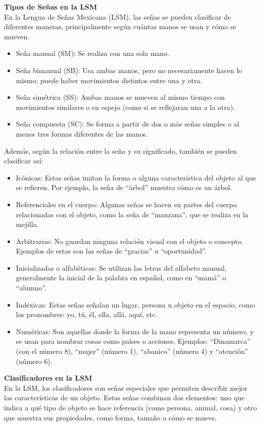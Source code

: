 \textbf{Tipos de Señas en la LSM}\\
En la Lengua de Señas Mexicana (LSM), las señas se pueden clasificar de diferentes maneras, principalmente según cuántas manos se usan y cómo se mueven.

\begin{itemize}
    \item Seña manual (SM): Se realiza con una sola mano.
    \item Seña bimanual (SB): Usa ambas manos, pero no necesariamente hacen lo mismo; puede haber movimientos distintos entre una y otra.
    \item Seña simétrica (SS): Ambas manos se mueven al mismo tiempo con movimientos similares o en espejo (como si se reflejaran una a la otra).
    \item Seña compuesta (SC): Se forma a partir de dos o más señas simples o al menos tres formas diferentes de las manos.
\end{itemize}

\newpage
Además, según la relación entre la seña y su significado, también se pueden clasificar así:
\begin{itemize}
    \item Icónicas: Estas señas imitan la forma o alguna característica del objeto al que se refieren. Por ejemplo, la seña de “árbol” muestra cómo es un árbol.
    \item Referenciales en el cuerpo: Algunas señas se hacen en partes del cuerpo relacionadas con el objeto, como la seña de “manzana”, que se realiza en la mejilla.
    \item Arbitrarias: No guardan ninguna relación visual con el objeto o concepto. Ejemplos de estas son las señas de “gracias” u “oportunidad”.
    \item Inicializadas o alfabéticas: Se utilizan las letras del alfabeto manual, generalmente la inicial de la palabra en español, como en “mamá” o “alumno”.
    \item Indéxicas: Estas señas señalan un lugar, persona u objeto en el espacio, como los pronombres: yo, tú, él, ella, allá, aquí, etc.
    \item Numéricas: Son aquellas donde la forma de la mano representa un número, y se usan para nombrar cosas como países o acciones. Ejemplos: “Dinamarca” (con el número 8), “mujer” (número 1), “abanico” (número 4) y “atención” (número 6).\\
\end{itemize}

\textbf{Clasificadores en la LSM}\\
En la LSM, los clasificadores son señas especiales que permiten describir mejor las características de un objeto. Estas señas combinan dos elementos: uno que indica a qué tipo de objeto se hace referencia (como persona, animal, cosa) y otro que muestra sus propiedades, como forma, tamaño o cómo se mueve.\\


